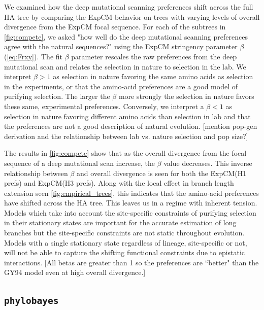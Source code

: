 \documentclass[11pt]{article}
\newcommand\skhcomment[1]{{\color{cyan}[#1]}}
\begin{document}

We examined how the deep mutational scanning preferences shift across the full HA tree by comparing the ExpCM behavior on trees with varying levels of overall divergence from the ExpCM focal sequence. 
For each of the subtrees in \ref{fig:compete}, we asked "how well do the deep mutational scanning preferences agree with the natural sequences?" using the ExpCM stringency parameter $\beta$ (\ref{eq:Frxy}). 
The fit $\beta$ parameter rescales the raw preferences from the deep mutational scan and relates the selection in nature to selection in the lab. 
We interpret $\beta >1$ as selection in nature favoring the same amino acids as selection in the experiments, or that the amino-acid preferences are a good model of purifying selection. 
The larger the $\beta$ more strongly the selection in nature favors these same, experimental preferences. 
Conversely, we interpret a $\beta<1$ as selection in nature favoring different amino acids than selection in lab and that the preferences are not a good description of natural evolution.  
\skhcomment{mention pop-gen derivation and the relationship between lab vs. nature selection and pop size?}

The results in \ref{fig:compete} show that as the overall divergence from the focal sequence of a deep mutational scan increase, the $\beta$ value decreases. 
This inverse relationship between $\beta$ and overall divergence is seen for both the ExpCM(H1 prefs) and ExpCM(H3 prefs). 
Along with the local effect in branch length extension seen \ref{fig:empirical_trees}, this indicates that the amino-acid preferences have shifted across the HA tree. 
This leaves us in a regime with inherent tension. 
Models which take into account the site-specific constraints of purifying selection in their stationary states are important for the accurate estimation of long branches but the site-specific constraints are not static throughout evolution. 
Models with a single stationary state regardless of lineage, site-specific or not, will not be able to capture the shifting functional constraints due to epistatic interactions. 
\skhcomment{All betas are greater than 1 so the preferences are ``better" than the GY94 model even at high overall divergence.}

\subsection*{\texttt{phylobayes}}
\end{document}
